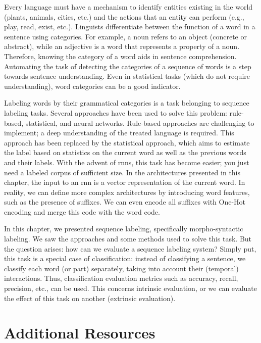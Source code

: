 \documentclass{KBook}
\begin{document}
Every language must have a mechanism to identify entities existing in the world (plants, animals, cities, etc.) and the actions that an entity can perform (e.g., play, read, exist, etc.). Linguists differentiate between the function of a word in a sentence using categories. For example, a noun refers to an object (concrete or abstract), while an adjective is a word that represents a property of a noun. Therefore, knowing the category of a word aids in sentence comprehension. Automating the task of detecting the categories of a sequence of words is a step towards sentence understanding. Even in statistical tasks (which do not require understanding), word categories can be a good indicator.

Labeling words by their grammatical categories is a task belonging to sequence labeling tasks. Several approaches have been used to solve this problem: rule-based, statistical, and neural networks. Rule-based approaches are challenging to implement; a deep understanding of the treated language is required. This approach has been replaced by the statistical approach, which aims to estimate the label based on statistics on the current word as well as the previous words and their labels. With the advent of \acp{rnn}, this task has become easier; you just need a labeled corpus of sufficient size. In the architectures presented in this chapter, the input to an \ac{rnn} is a vector representation of the current word. In reality, we can define more complex architectures by introducing word features, such as the presence of suffixes. We can even encode all suffixes with One-Hot encoding and merge this code with the word code.

In this chapter, we presented sequence labeling, specifically morpho-syntactic labeling. We saw the approaches and some methods used to solve this task. But the question arises: how can we evaluate a sequence labeling system? Simply put, this task is a special case of classification: instead of classifying a sentence, we classify each word (or part) separately, taking into account their (temporal) interactions. Thus, classification evaluation metrics such as accuracy, recall, precision, etc., can be used. This concerns intrinsic evaluation, or we can evaluate the effect of this task on another (extrinsic evaluation).


\section{Additional Resources}
\end{document}
